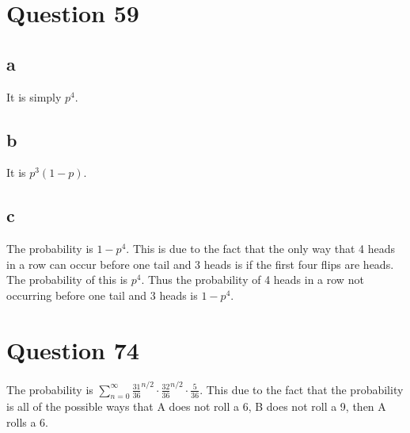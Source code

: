 \documentclass{article}
\begin{document}
\section*{Question 59}
\subsection*{a}
It is simply $p^4$.
\subsection*{b}
It is $p^3(1-p)$.
\subsection*{c}
The probability is $1-p^4$. This is due to the fact that the only way that 4 heads in a row can occur before one tail and 3 heads is if the first four flips are heads. The probability of this is $p^4$. Thus the probability of 4 heads in a row not occurring before one tail and 3 heads is $1-p^4$.
\section*{Question 74}
The probability is $\sum_{n=0}^{\infty} \frac{31}{36}^{n/2} \cdot \frac{32}{36}^{n/2} \cdot \frac{5}{36}$. This due to the fact that the probability is all of the possible ways that A does not roll a 6, B does not roll a 9, then A rolls a 6. 
\end{document}
